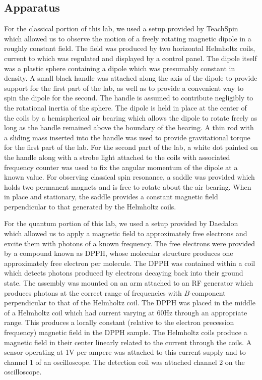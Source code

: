 \documentclass{amsart}
\numberwithin{equation}{section}
\begin{document}
\subsection{Apparatus}
For the classical portion of this lab, we used a setup provided by TeachSpin which allowed us to observe the motion of a freely rotating magnetic dipole in a roughly constant field. The field was produced by two horizontal Helmholtz coils, current to which was regulated and displayed by a control panel. The dipole itself was a plastic sphere containing a dipole which was presumably constant in density. A small black handle was attached along the axis of the dipole to provide support for the first part of the lab, as well as to provide a convenient way to spin the dipole for the second. The handle is assumed to contribute negligibly to the rotational inertia of the sphere. The dipole is held in place at the center of the coils by a hemispherical air bearing which allows the dipole to rotate freely as long as the handle remained above the boundary of the bearing. A thin rod with a sliding mass inserted into the handle was used to provide gravitational torque for the first part of the lab. For the second part of the lab, a white dot painted on the handle along with a strobe light attached to the coils with associated frequency counter was used to fix the angular momentum of the dipole at a known value. For observing classical spin resonance, a saddle was provided which holds two permanent magnets and is free to rotate about the air bearing. When in place and stationary, the saddle provides a constant magnetic field perpendicular to that generated by the Helmholtz coils.

For the quantum portion of this lab, we used a setup provided by Daedalon which allowed us to apply a magnetic field to approximately free electrons and excite them with photons of a known frequency. The free electrons were provided by a compound known as DPPH, whose molecular structure produces one approximately free electron per molecule. The DPPH was contained within a coil which detects photons produced by electrons decaying back into their ground state. The assembly was mounted on an arm attached to an RF generator which produces photons at the correct range of frequencies with $B$-component perpendicular to that of the Helmholtz coil. The DPPH was placed in the middle of a Helmholtz coil which had current varying at $60$Hz through an appropriate range. This produces a locally constant (relative to the electron precession frequency) magnetic field in the DPPH sample. The Helmholtz coils produce a magnetic field in their center linearly related to the current through the coils. A sensor operating at 1V per ampere was attached to this current supply and to channel 1 of an oscilloscope. The detection coil was attached channel 2 on the oscilloscope.
\end{document}
